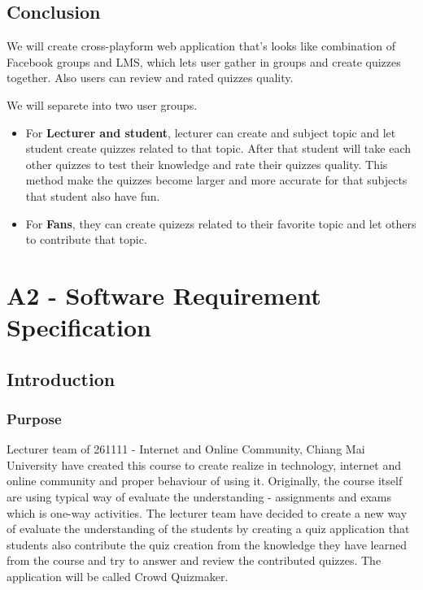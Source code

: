 \documentclass[ 10pt]{report}
\begin{document}
    \pagebreak
    \section{Conclusion}

    We will create cross-playform web application that's looks like combination of Facebook groups and LMS, which lets user gather in groups and create quizzes together. Also users can review and rated quizzes quality.

    We will separete into two user groups.
    \begin{itemize}
        \item For \textbf{Lecturer and student}, lecturer can create and subject topic and let student create quizzes related to that topic. After that student will take each other quizzes to test their knowledge and rate their quizzes quality. This method make the quizzes become larger and more accurate for that subjects that student also have fun.
        \item For \textbf{Fans}, they can create quizezs related to their favorite topic and let others to contribute that topic.
    \end{itemize}


    \chapter{A2 - Software Requirement Specification}
    \section{Introduction}
        \subsection{Purpose}
        Lecturer team of 261111 - Internet and Online Community, Chiang Mai University have created this course to create realize in technology, internet and online community and proper behaviour of using it. Originally, the course itself are using typical way of evaluate the understanding - assignments and exams which is one-way activities. The lecturer team have decided to create a new way of evaluate the understanding of the students by creating a quiz application that students also contribute the quiz creation from the knowledge they have learned from the course and try to answer and review the contributed quizzes. The application will be called Crowd Quizmaker.
\end{document}
